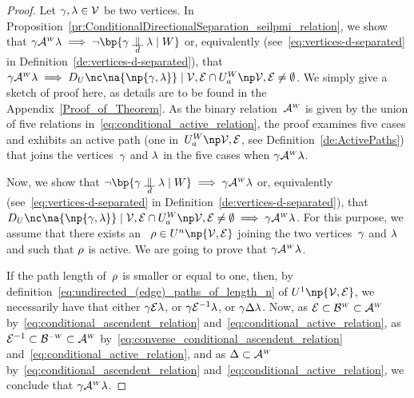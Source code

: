 \documentclass[12pt]{article}
\begin{document}
{{\begin{proof}
  Let \( \gamma,\lambda \in {\cal V} \) be two vertices. 
  In Proposition~\ref{pr:ConditionalDirectionalSeparation_seilpmi_relation},
  we show that 
  \( \bgent \ConditionalActive \cgent \implies 
  \neg \bp{\bgent \ConditionalDirectionalSeparation \cgent \mid \AgentSubsetW}
  \) or, equivalently (see~\eqref{eq:vertices-d-separated} in
  Definition~\ref{de:vertices-d-separated}), that 
  \(  \bgent {\ConditionalActive} \cgent \implies
  \DeploymentInUPaths{\na{\np{\bgent,\cgent}}}{\graph} 
  \cap \ActiveUndirectedPaths{\graph} 
  \neq\emptyset \).
  We simply give a sketch of proof here, as details are to be found in the Appendix~\ref{Proof_of_Theorem}. 
  As the binary relation~\(  \mathcal{A}^{\text{\tiny $W$}} \) is given by the union of five
  relations in~\eqref{eq:conditional_active_relation},
  the proof examines five cases and exhibits an active path
  (one in~\( \ActiveUndirectedPaths{\graph} \), see Definition~\ref{de:ActivePaths})
  that joins the vertices~\( \gamma \) and \( \lambda \) in the five cases
  when \( \gamma \mathcal{A}^{\text{\tiny $W$}} \lambda \). 
  \medskip

  Now,  we show that 
  \( \neg \bp{\bgent \ConditionalDirectionalSeparation \cgent \mid \AgentSubsetW}
  \implies \bgent \ConditionalActive \cgent \) or, equivalently (see~\eqref{eq:vertices-d-separated} in
  Definition~\ref{de:vertices-d-separated}), that 
  \(
  \DeploymentInUPaths{\na{\np{\bgent,\cgent}}}{\graph} 
  \cap \ActiveUndirectedPaths{\graph} 
  \neq\emptyset 
  \implies
  \bgent {\ConditionalActive} \cgent \).
  For this purpose, we assume that there exists an \undirectedEdgePath\
  \( \UndirectedPath \in \UPATH^{n}\np{\graph} \)
  joining the two vertices~$\gamma$ and $\lambda$ and such that \( \rho
  \) is active.
  We are going to prove that $\gamma \mathcal{A}^{\text{\tiny $W$}}\lambda$.
  
  If the path length of~\( \rho \) is smaller or equal to one, then,
  by definition~\eqref{eq:undirected_(edge)_paths_of_length_n} of
  $\UPATH^{1}\np{\OrientedGraph}$, we necessarily have that
  either $\gamma {\cal E}\lambda$, or $\gamma {\cal E}^{-1}\lambda$,
  or $\gamma \Delta\lambda$.
  Now, as \( {\cal E} \subset \mathcal{B}^{\text{\tiny $W$}} \subset
  \mathcal{A}^{\text{\tiny $W$}} \)
  by~\eqref{eq:conditional_ascendent_relation}
  and~\eqref{eq:conditional_active_relation}, 
  as \( {\cal E}^{-1} \subset \mathcal{B}^{\text{\tiny$-W$}} \subset
  \mathcal{A}^{\text{\tiny $W$}} \)
  by~\eqref{eq:converse_conditional_ascendent_relation}
  and~\eqref{eq:conditional_active_relation}, 
  and as \( \Delta \subset \mathcal{A}^{\text{\tiny $W$}} \)
  by~\eqref{eq:conditional_ascendent_relation}
  and~\eqref{eq:conditional_active_relation},
  we conclude that $\gamma \mathcal{A}^{\text{\tiny $W$}} \lambda$.
  

\end{proof}}}
\end{document}
